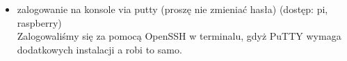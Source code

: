 \documentclass[a4paper,12pt]{extarticle}  %
\begin{document}
\begin{enumerate}
\begin{itemize}
\begin{figure}[H]
           \centering
        \end{figure}
        \item zalogowanie na konsole via putty (proszę nie zmieniać hasła) (dostęp: pi, raspberry)\\
        Zalogowaliśmy się za pomocą OpenSSH w terminalu, gdyż PuTTY wymaga dodatkowych instalacji a robi to samo.
        \begin{figure}[H]
           \centering
        \end{figure}
    \end{itemize}
    

\end{enumerate}
\end{document}
